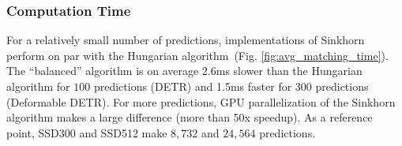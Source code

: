 \subsubsection{Computation Time}
For a relatively small number of predictions, implementations of Sinkhorn perform on par with the Hungarian algorithm~(Fig. \ref{fig:avg_matching_time}). The ``balanced'' algorithm is on average 2.6ms slower than the Hungarian algorithm for $100$ predictions (DETR) and 1.5ms faster for 300 predictions (Deformable DETR). For more predictions, GPU parallelization of the Sinkhorn algorithm makes a large difference (more than 50x speedup). As a reference point, SSD300 and SSD512 make $8,732$ and $24,564$ predictions.
